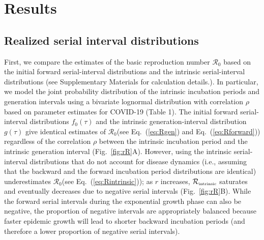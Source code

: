 \documentclass[12pt]{article}
\newcommand{\eref}[1]{Eq.~(\ref{eq:#1})}
\newcommand{\fref}[1]{Fig.~\ref{fig:#1}}
\newcommand{\Rx}[1]{\ensuremath{{\mathcal R}_{#1}}\xspace}
\newcommand{\Ro}{\Rx{0}}
\newcommand{\Rintrinsic}{\ensuremath{{\mathcal R}_{\textrm{\tiny intrinsic}}}\xspace}
\newcommand{\gdist}{g} %
\begin{document}
\section{Results}

\subsection{Realized serial interval distributions}

First, we compare the estimates of the basic reproduction number \Ro based on the initial forward serial-interval distributions and the intrinsic serial-interval distributions (see Supplementary Materials for calculation details.).
In particular, we model the joint probability distribution of the intrinsic incubation periods and generation intervals using a bivariate lognormal distribution with correlation $\rho$ based on parameter estimates for COVID-19 (Table 1).
The initial forward serial-interval distributions $f_0(\tau)$ and the intrinsic generation-interval distribution $\gdist(\tau)$ give identical estimates of \Ro (see \eref{Rgen} and \eref{Rforward}) regardless of the correlation $\rho$ between the intrinsic incubation period and the intrinsic generation interval (\fref{rR}A).
However, using the intrinsic serial-interval distributions that do not account for disease dynamics (i.e., assuming that the backward and the forward incubation period distributions are identical) underestimates \Ro (see \eref{Rintrinsic});
as $r$ increases, \Rintrinsic saturates and eventually decreases due to negative serial intervals (\fref{rR}B).
While the forward serial intervals during the exponential growth phase can also be negative, the proportion of negative intervals are appropriately balanced because faster epidemic growth will lead to shorter backward incubation periods (and therefore a lower proportion of negative serial intervals).
\end{document}
